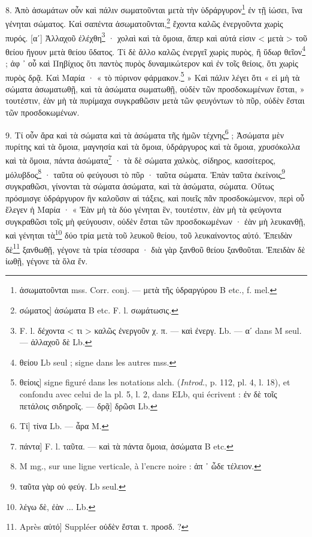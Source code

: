\documentclass[a4paper, 11pt, oneside, polutonikogreek, french]{article}
\begin{document}
8. Ἀπὸ ἀσωμάτων οὖν καὶ πάλιν σωματοῦνται μετὰ τὴν ὑδράργυρον\footnote{ἀσωματοῦνται mss. Corr. conj. --- μετὰ τῆς ὑδραργύρου B etc., f. mel.} ἐν τῇ ἰώσει, ἵνα γένηται σώματος. Καὶ σαπέντα ἀσωματοῦνται,\footnote{σώματος] ἀσώματα B etc. F. l. σωμάτωσις.} ἔχοντα καλῶς ἐνεργοῦντα χωρὶς πυρός. [αʹ] Ἀλλαχοῦ ἐλέχθη\footnote{F. l. δέχοντα < τι > καλῶς ἐνεργοῦν χ. π. --- καὶ ἐνεργ. Lb. --- αʹ dans M seul. --- ἀλλαχοῦ δὲ Lb.} · χολαὶ καὶ τὰ ὅμοια, ἅπερ καὶ αὐτά εἰσιν < μετὰ > τοῦ θείου ἤγουν μετὰ θείου ὕδατος. Τί δὲ ἄλλο καλῶς ἐνεργεῖ χωρὶς πυρὸς, ἢ ὕδωρ θεῖον\footnote{θείου Lb seul ; signe dans les autres mss.} ; ἀφ ᾽ οὗ καὶ Πηβίχιος ὅτι παντὸς πυρὸς δυναμικώτερον καὶ ἐν τοῖς θείοις, ὅτι χωρὶς πυρὸς δρᾷ. Καὶ Μαρία · « τὸ πύρινον φάρμακον.\footnote{θείοις] signe figuré dans les notations alch. (\emph{Introd.}, p. 112, pl. 4, l. 18), et confondu avec celui de la pl. 5, l. 2, dans ELb, qui écrivent : ἐν δὲ τοῖς πετάλοις σιδηροῖς. --- δρᾷ] δρῶσι Lb.} » Καὶ πάλιν λέγει ὅτι « εἰ μὴ τὰ σώματα ἀσωματωθῇ, καὶ τὰ ἀσώματα σωματωθῇ, οὐδὲν τῶν προσδοκωμένων ἔσται, » τουτέστιν, ἐὰν μὴ τὰ πυρίμαχα συγκραθῶσιν μετὰ τῶν φευγόντων τὸ πῦρ, οὐδὲν ἔσται τῶν προσδοκωμένων.

9. Τί οὖν ἄρα καὶ τὰ σώματα καὶ τὰ ἀσώματα τῆς ἡμῶν τέχνης\footnote{Τί] τίνα Lb. --- ἆρα M.} ; Ἀσώματα μὲν πυρίτης καὶ τὰ ὅμοια, μαγνησία καὶ τὰ ὅμοια, ὑδράργυρος καὶ τὰ ὅμοια, χρυσόκολλα καὶ τὰ ὅμοια, πάντα ἀσώματα\footnote{πάντα] F. l. ταῦτα. --- καὶ τὰ πάντα ὅμοια, ἀσώματα B etc.} · τὰ δὲ σώματα χαλκὸς, σίδηρος, κασσίτερος, μόλυβδος\footnote{M mg., sur une ligne verticale, à l'encre noire : ἀπ ᾽ ὦδε τέλειον.} · ταῦτα οὐ φεύγουσι τὸ πῦρ · ταῦτα σώματα. Ἐπὰν ταῦτα ἐκείνοις\footnote{ταῦτα γὰρ οὐ φεύγ. Lb seul.} συγκραθῶσι, γίνονται τὰ σώματα ἀσώματα, καὶ τὰ ἀσώματα, σώματα. Οὕτως πρόσμισγε ὑδράργυρον ἣν καλοῦσιν αἱ τάξεις, καὶ ποιεῖς πᾶν προσδοκώμενον, περὶ οὗ ἔλεγεν ἡ Μαρία · « Ἐὰν μὴ τὰ δύο γένηται ἓν, τουτέστιν, ἐὰν μὴ τὰ φεύγοντα συγκραθῶσι τοῖς μὴ φεύγουσιν, οὐδὲν ἔσται τῶν προσδοκωμένων · ἐὰν μὴ λευκανθῇ, καὶ γένηται τὰ\footnote{λέγω δὲ, ἐὰν ... Lb.} δύο τρία μετὰ τοῦ λευκοῦ θείου, τοῦ λευκαίνοντος αὐτό. Ἐπειδὰν δὲ\footnote{Après αὐτό] Suppléer οὐδὲν ἔσται τ. προσδ. ?} ξανθωθῇ, γέγονε τὰ τρία τέσσαρα · διὰ γὰρ ξανθοῦ θείου ξανθοῦται. Ἐπειδὰν δὲ ἰωθῇ, γέγονε τὰ ὅλα ἕν.
\end{document}
